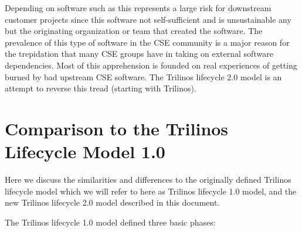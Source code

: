 \documentclass[11pt]{SANDreport}
\begin{document}
Depending on software such as this represents a large risk for
downstream customer projects since this software not self-sufficient
and is unsustainable any but the originating organization or team that
created the software.  The prevalence of this type of software in the
CSE community is a major reason for the trepidation that many CSE
groups have in taking on external software dependencies.  Most of this
apprehension is founded on real experiences of getting burned by bad
upstream CSE software.  The Trilinos lifecycle 2.0 model is an attempt
to reverse this tread (starting with Trilinos).


%
\section{Comparison to the Trilinos Lifecycle Model 1.0}
\label{sec:compare_with_lifecycle_1.0_model}
%

Here we discuss the similarities and differences to the originally
defined Trilinos lifecycle model {}\cite{TrilinosLifecycleModel2007}
which we will refer to here as Trilinos lifecycle 1.0 model, and the
new Trilinos lifecycle 2.0 model described in this document.

The Trilinos lifecycle 1.0 model defined three basic phases:
\end{document}
